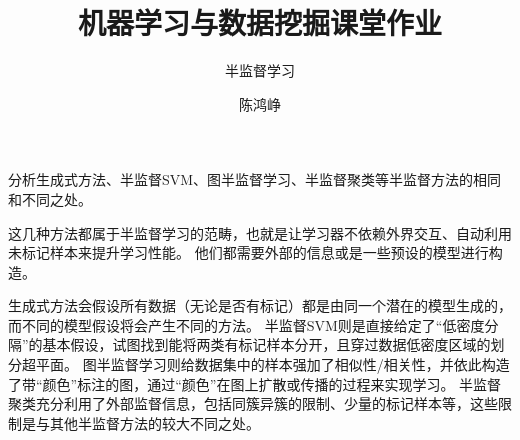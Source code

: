 \documentclass[logo,reportComp]{thesis}
\title{机器学习与数据挖掘课堂作业}
\subtitle{半监督学习}
\author{陈鸿峥}
\begin{document}
\maketitle

\begin{question}
分析生成式方法、半监督SVM、图半监督学习、半监督聚类等半监督方法的相同和不同之处。
\end{question}
\begin{answer}
这几种方法都属于半监督学习的范畴，也就是让学习器不依赖外界交互、自动利用未标记样本来提升学习性能。
他们都需要外部的信息或是一些预设的模型进行构造。

生成式方法会假设所有数据（无论是否有标记）都是由同一个潜在的模型生成的，而不同的模型假设将会产生不同的方法。
半监督SVM则是直接给定了“低密度分隔”的基本假设，试图找到能将两类有标记样本分开，且穿过数据低密度区域的划分超平面。
图半监督学习则给数据集中的样本强加了相似性/相关性，并依此构造了带“颜色”标注的图，通过“颜色”在图上扩散或传播的过程来实现学习。
半监督聚类充分利用了外部监督信息，包括同簇异簇的限制、少量的标记样本等，这些限制是与其他半监督方法的较大不同之处。
\end{answer}
\end{document}
